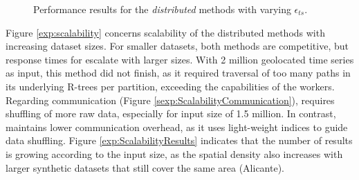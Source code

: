 \begin{figure}[!tb]
 \centering
 \caption{Performance results for the {\em distributed} methods with varying $\epsilon_{ts}$.}
 \label{exp:distr_EpsTS}
\end{figure}

Figure \ref{exp:scalability} concerns scalability of the distributed methods with increasing dataset sizes. For smaller datasets, both methods are competitive, but response times for \base escalate with larger sizes. With 2 million geolocated time series as input, this method did not finish, as it required traversal of too many paths in its underlying R-trees per partition, exceeding the capabilities of the workers. Regarding communication (Figure \ref{sexp:ScalabilityCommunication}), \base requires shuffling of more raw data, especially for input size of 1.5 million. In contrast, \opt maintains lower communication overhead, as it uses light-weight indices to guide data shuffling. Figure \ref{exp:ScalabilityResults} indicates that the number of results is growing according to the input size, as the spatial density also increases with larger synthetic datasets that still cover  the same area (Alicante).

